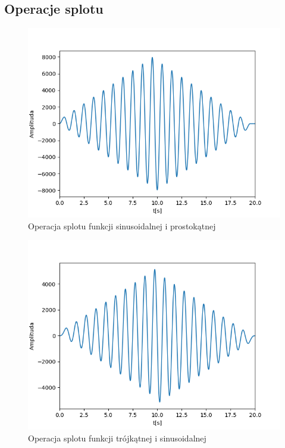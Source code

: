 \documentclass[12pt]{article}
\begin{document}
\subsection{Operacje splotu}
\begin{figure}[H]
\centering
\includegraphics[scale=0.6]{splotSinusProstokat.png}
\caption{Operacja splotu funkcji sinusoidalnej i prostokątnej}
\end{figure}

\begin{figure}[H]
\centering
\includegraphics[scale=0.6]{splotTrojkatSinus.png}
\caption{Operacja splotu funkcji trójkątnej i sinusoidalnej}
\end{figure}
\end{document}
